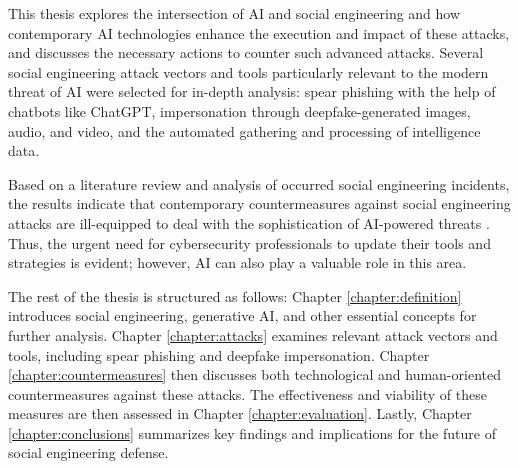 This thesis explores the intersection of AI and social engineering and how contemporary AI technologies enhance the execution and impact of these attacks, and discusses the necessary actions to counter such advanced attacks. Several social engineering attack vectors and tools particularly relevant to the modern threat of AI were selected for in-depth analysis: spear phishing with the help of chatbots like ChatGPT, impersonation through deepfake-generated images, audio, and video, and the automated gathering and processing of intelligence data.




Based on a literature review and analysis of occurred social engineering incidents, the results indicate that contemporary countermeasures against social engineering attacks are ill-equipped to deal with the sophistication of AI-powered threats \citep{fakhouriAIDrivenSolutionsForSocialEngineeringAttacks2024, blauthArtificialIntelligenceCrime2022}. Thus, the urgent need for cybersecurity professionals to update their tools and strategies is evident; however, AI can also play a valuable role in this area.





%
%

The rest of the thesis is structured as follows: Chapter \ref{chapter:definition} introduces social engineering, generative AI, and other essential concepts for further analysis. Chapter \ref{chapter:attacks} examines relevant attack vectors and tools, including spear phishing and deepfake impersonation. Chapter \ref{chapter:countermeasures} then discusses both technological and human-oriented countermeasures against these attacks. The effectiveness and viability of these measures are then assessed in Chapter \ref{chapter:evaluation}. Lastly, Chapter \ref{chapter:conclusions} summarizes key findings and implications for the future of social engineering defense.




